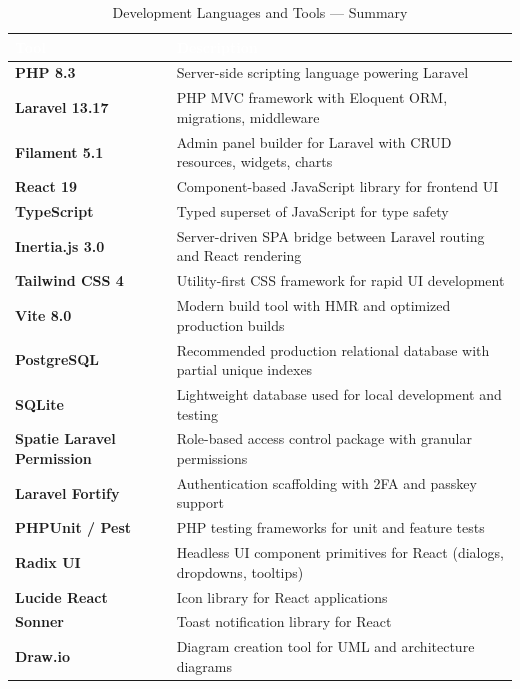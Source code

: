 \documentclass{bts-report}
\begin{document}
\begin{table}[H]
  \centering
  \caption{Development Languages and Tools --- Summary}
  \vspace{0.2cm}
  \begin{tabularx}{\textwidth}{|>{\bfseries}p{3.5cm}|X|}
    \hline
    \rowcolor{tableheader}
    \textcolor{white}{\textbf{Tool}} & \textcolor{white}{\textbf{Description}} \\
    \hline
    PHP 8.3 & Server-side scripting language powering Laravel \\
    \hline
    Laravel 13.17 & PHP MVC framework with Eloquent ORM, migrations, middleware \\
    \hline
    Filament 5.1 & Admin panel builder for Laravel with CRUD resources, widgets, charts \\
    \hline
    React 19 & Component-based JavaScript library for frontend UI \\
    \hline
    TypeScript & Typed superset of JavaScript for type safety \\
    \hline
    Inertia.js 3.0 & Server-driven SPA bridge between Laravel routing and React rendering \\
    \hline
    Tailwind CSS 4 & Utility-first CSS framework for rapid UI development \\
    \hline
    Vite 8.0 & Modern build tool with HMR and optimized production builds \\
    \hline
    PostgreSQL & Recommended production relational database with partial unique indexes \\
    \hline
    SQLite & Lightweight database used for local development and testing \\
    \hline
    Spatie Laravel Permission & Role-based access control package with granular permissions \\
    \hline
    Laravel Fortify & Authentication scaffolding with 2FA and passkey support \\
    \hline
    PHPUnit / Pest & PHP testing frameworks for unit and feature tests \\
    \hline
    Radix UI & Headless UI component primitives for React (dialogs, dropdowns, tooltips) \\
    \hline
    Lucide React & Icon library for React applications \\
    \hline
    Sonner & Toast notification library for React \\
    \hline
    Draw.io & Diagram creation tool for UML and architecture diagrams \\
    \hline
  \end{tabularx}
\end{table}
\end{document}
